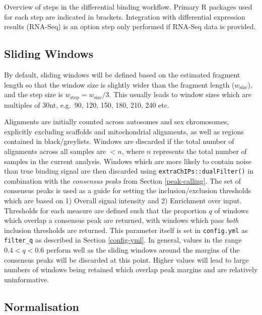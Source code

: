 \documentclass[
]{book}
\begin{document}
\label{fig:unnamed-chunk-4}Overview of steps in the differential binding workflow. Primary R packages used for each step are indicated in brackets. Integration with differential expression results (RNA-Seq) is an option step only performed if RNA-Seq data is provided.

\hypertarget{sliding-windows}{%
\subsection*{Sliding Windows}\label{sliding-windows}}

By default, sliding windows will be defined based on the estimated fragment length so that the window size is slightly wider than the fragment length (\(w_\text{size}\)), and the step size is \(w_\text{step} = w_\text{size} / 3\).
This usually leads to window sizes which are multiples of 30nt, e.g.~90, 120, 150, 180, 210, 240 etc.

Alignments are initially counted across autosomes and sex chromosomes, explicitly excluding scaffolds and mitochondrial alignments, as well as regions contained in black/greylists.
Windows are discarded if the total number of alignments across all samples are \(<n\), where \(n\) represents the total number of samples in the current analysis.
Windows which are more likely to contain noise than true binding signal are then discarded using \texttt{extraChIPs::dualFilter()} in combination with the \emph{consensus peaks} from Section \ref{peak-calling}.
The set of consensus peaks is used as a guide for setting the inclusion/exclusion thresholds which are based on 1) Overall signal intensity and 2) Enrichment over input.
Thresholds for each measure are defined such that the proportion \(q\) of windows which overlap a consensus peak are returned, with windows which pass \emph{both} inclusion thresholds are returned.
This parameter itself is set in \texttt{config.yml} as \texttt{filter\_q} as described in Section \ref{config-yml}.
In general, values in the range \(0.4 < q < 0.6\) perform well as the sliding windows around the margins of the consensus peaks will be discarded at this point.
Higher values will lead to large numbers of windows being retained which overlap peak margins and are relatively uninformative.

\hypertarget{normalisation}{%
\subsection*{Normalisation}\label{normalisation}}
\end{document}
